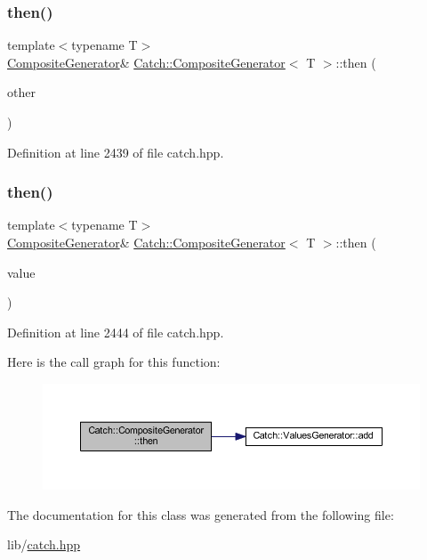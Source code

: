 \subsubsection{\texorpdfstring{then()}{then()}\hspace{0.1cm}{\footnotesize\ttfamily [1/2]}}
{\footnotesize\ttfamily template$<$typename T$>$ \\
\hyperlink{class_catch_1_1_composite_generator}{Composite\+Generator}\& \hyperlink{class_catch_1_1_composite_generator}{Catch\+::\+Composite\+Generator}$<$ T $>$\+::then (\begin{DoxyParamCaption}\item[{\hyperlink{class_catch_1_1_composite_generator}{Composite\+Generator}$<$ T $>$ \&}]{other }\end{DoxyParamCaption})\hspace{0.3cm}{\ttfamily [inline]}}



Definition at line 2439 of file catch.\+hpp.

\hypertarget{class_catch_1_1_composite_generator_aefdc11bcfccdf07d2db5f0da3ed8758c}{}\label{class_catch_1_1_composite_generator_aefdc11bcfccdf07d2db5f0da3ed8758c} 
\subsubsection{\texorpdfstring{then()}{then()}\hspace{0.1cm}{\footnotesize\ttfamily [2/2]}}
{\footnotesize\ttfamily template$<$typename T$>$ \\
\hyperlink{class_catch_1_1_composite_generator}{Composite\+Generator}\& \hyperlink{class_catch_1_1_composite_generator}{Catch\+::\+Composite\+Generator}$<$ T $>$\+::then (\begin{DoxyParamCaption}\item[{T}]{value }\end{DoxyParamCaption})\hspace{0.3cm}{\ttfamily [inline]}}



Definition at line 2444 of file catch.\+hpp.

Here is the call graph for this function\+:\nopagebreak
\begin{figure}[H]
\begin{center}
\leavevmode
\includegraphics[width=350pt]{class_catch_1_1_composite_generator_aefdc11bcfccdf07d2db5f0da3ed8758c_cgraph}
\end{center}
\end{figure}


The documentation for this class was generated from the following file\+:\begin{DoxyCompactItemize}
\item 
lib/\hyperlink{catch_8hpp}{catch.\+hpp}\end{DoxyCompactItemize}
